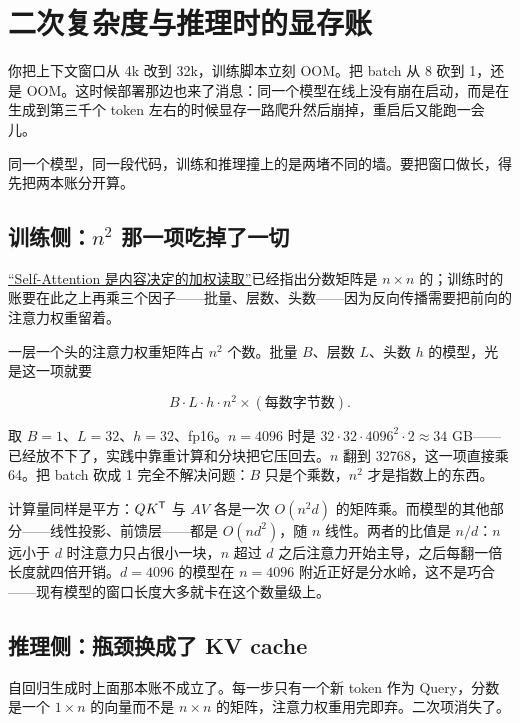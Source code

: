 \section{二次复杂度与推理时的显存账}
\label{sec:14-Deep-Learning/05-Attention-and-Sequence-Models/05}

你把上下文窗口从 4k 改到 32k，训练脚本立刻 OOM。把 batch 从 8 砍到 1，还是 OOM。这时候部署那边也来了消息：同一个模型在线上没有崩在启动，而是在生成到第三千个 token 左右的时候显存一路爬升然后崩掉，重启后又能跑一会儿。

同一个模型，同一段代码，训练和推理撞上的是两堵不同的墙。要把窗口做长，得先把两本账分开算。

\subsection{训练侧：\(n^2\) 那一项吃掉了一切}

\hyperref[sec:14-Deep-Learning/05-Attention-and-Sequence-Models/01]{``Self-Attention 是内容决定的加权读取''}已经指出分数矩阵是 \(n\times n\) 的；训练时的账要在此之上再乘三个因子——批量、层数、头数——因为反向传播需要把前向的注意力权重留着。

一层一个头的注意力权重矩阵占 \(n^2\) 个数。批量 \(B\)、层数 \(L\)、头数 \(h\) 的模型，光是这一项就要

\[
B\cdot L\cdot h\cdot n^2 \times (\text{每数字节数}).
\]

取 \(B=1\)、\(L=32\)、\(h=32\)、fp16。\(n=4096\) 时是 \(32\cdot32\cdot4096^2\cdot2\approx 34\) GB——已经放不下了，实践中靠重计算和分块把它压回去。\(n\) 翻到 32768，这一项直接乘 64。把 batch 砍成 1 完全不解决问题：\(B\) 只是个乘数，\(n^2\) 才是指数上的东西。

计算量同样是平方：\(QK^{\mathsf{T}}\) 与 \(AV\) 各是一次 \(O(n^2 d)\) 的矩阵乘。而模型的其他部分——线性投影、前馈层——都是 \(O(n d^2)\)，随 \(n\) 线性。两者的比值是 \(n/d\)：\(n\) 远小于 \(d\) 时注意力只占很小一块，\(n\) 超过 \(d\) 之后注意力开始主导，之后每翻一倍长度就四倍开销。\(d=4096\) 的模型在 \(n=4096\) 附近正好是分水岭，这不是巧合——现有模型的窗口长度大多就卡在这个数量级上。

\subsection{推理侧：瓶颈换成了 KV cache}

自回归生成时上面那本账不成立了。每一步只有一个新 token 作为 Query，分数是一个 \(1\times n\) 的向量而不是 \(n\times n\) 的矩阵，注意力权重用完即弃。二次项消失了。

